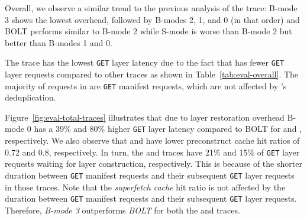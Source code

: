 Overall, we observe a similar trend to the previous analysis of the
\dal trace: B-mode 3 shows the lowest overhead, followed by
B-modes 2, 1, and 0 (in that order) and BOLT performs similar to B-mode 2
while S-mode is worse than B-mode 2 but better than B-modes 1 and 0.

The \lon trace has the lowest \texttt{GET} layer latency due to the fact that
\lon has fewer \texttt{GET} layer requests compared to other traces as shown in Table~\ref{tab:eval-overall}. 
%
The majority of requests in \lon are \texttt{GET} manifest requests, which are not affected
by \sysname{}'s deduplication.
%

Figure~\ref{fig:eval-total-traces} illustrates that due to layer restoration overhead
B-mode 0 has a 39\% and 80\% higher \texttt{GET} layer latency
compared to BOLT for \fra and \lon, respectively.
%
We also observe that \fra and \lon have lower preconstruct
cache hit ratios of 0.72 and 0.8, respectively.
%
In turn, the \fra and \lon traces have 21\% and 15\% of \texttt{GET} layer
requests waiting for layer construction, respectively.
%
%
This is because of the shorter duration between \texttt{GET} manifest requests and
their subsequent \texttt{GET} layer requests in those traces.
%
Note that the \emph{superfetch cache} hit ratio is not affected by the duration between \texttt{GET} manifest
requests and their subsequent \texttt{GET} layer requests.
%
%
Therefore, \emph{B-mode 3} outperforms \emph{BOLT} for both the \fra and \lon traces.
%
%
%



